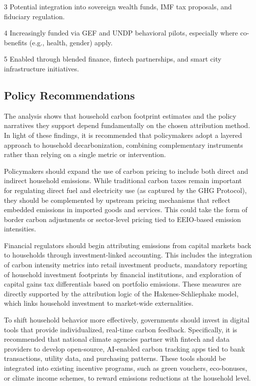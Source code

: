 \documentclass[12pt,a4paper]{article}%
\begin{document}
\begin{table}[h]
\begin{threeparttable}
\begin{tablenotes}
\item[3] Potential integration into sovereign wealth funds, IMF tax proposals, and fiduciary regulation.
\item[4] Increasingly funded via GEF and UNDP behavioral pilots, especially where co-benefits (e.g., health, gender) apply.
\item[5] Enabled through blended finance, fintech partnerships, and smart city infrastructure initiatives.
\end{tablenotes}
\end{threeparttable}
\end{table}

\subsection{Policy Recommendations}

The analysis shows that household carbon footprint estimates and the policy narratives they support depend fundamentally on the chosen attribution method. In light of these findings, it is recommended that policymakers adopt a layered approach to household decarbonization, combining complementary instruments rather than relying on a single metric or intervention. 

Policymakers should expand the use of carbon pricing to include both direct and indirect household emissions. While traditional carbon taxes remain important for regulating direct fuel and electricity use (as captured by the GHG Protocol), they should be complemented by upstream pricing mechanisms that reflect embedded emissions in imported goods and services. This could take the form of border carbon adjustments or sector-level pricing tied to EEIO-based emission intensities.

Financial regulators should begin attributing emissions from capital markets back to households through investment-linked accounting. This includes the integration of carbon intensity metrics into retail investment products, mandatory reporting of household investment footprints by financial institutions, and exploration of capital gains tax differentials based on portfolio emissions. These measures are directly supported by the attribution logic of the Hakenes-Schliephake model, which links household investment to market-wide externalities.

To shift household behavior more effectively, governments should invest in digital tools that provide individualized, real-time carbon feedback. Specifically, it is recommended that national climate agencies partner with fintech and data providers to develop open-source, AI-enabled carbon tracking apps tied to bank transactions, utility data, and purchasing patterns. These tools should be integrated into existing incentive programs, such as green vouchers, eco-bonuses, or climate income schemes, to reward emissions reductions at the household level.
\end{document}

